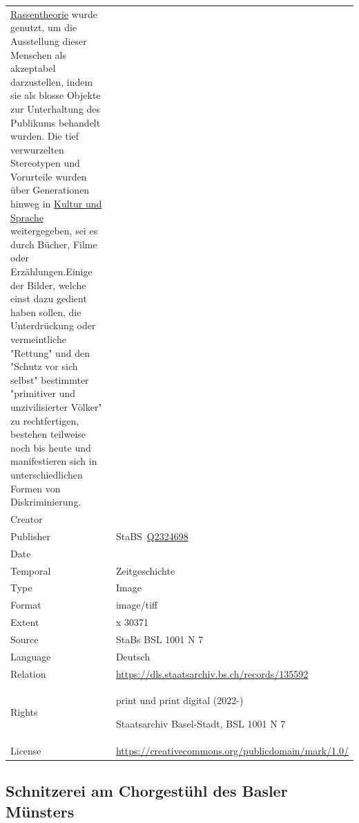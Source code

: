 \documentclass[
  letterpaper,
  DIV=11,
  numbers=noendperiod,
  landscape,
  a4paper,
  geometry:margin=1in]{scrartcl}
\begin{document}
\begin{longtable}[]{@{}
  >{\raggedright\arraybackslash}p{}
  >{\raggedright\arraybackslash}p{}@{}}
\href{https://hls-dhs-dss.ch/de/articles/060537/2024-04-08/}{Rassentheorie}
wurde genutzt, um die Ausstellung dieser Menschen als akzeptabel
darzustellen, indem sie als blosse Objekte zur Unterhaltung des
Publikums behandelt wurden. Die tief verwurzelten Stereotypen und
Vorurteile wurden über Generationen hinweg in
\href{https://mirsindvoda.ch/voelkerschauen-in-der-schweiz/}{Kultur und
Sprache} weitergegeben, sei es durch Bücher, Filme oder
Erzählungen.Einige der Bilder, welche einst dazu gedient haben sollen,
die Unterdrückung oder vermeintliche "Rettung" und den "Schutz vor sich
selbst" bestimmter "primitiver und unzivilisierter Völker" zu
rechtfertigen, bestehen teilweise noch bis heute und manifestieren sich
in unterschiedlichen Formen von Diskriminierung. \textbar{} \\
Creator & \\
Publisher &
StaBS~\href{https://www.wikidata.org/wiki/Q2324698}{Q2324698} \\
Date & 1926 \\
Temporal & Zeitgeschichte \\
Type & Image \\
Format & image/tiff \\
Extent & 23376 x 30371 \\
Source & StaBs BSL 1001 N 7 \\
Language & Deutsch \\
Relation & \url{https://dls.staatsarchiv.bs.ch/records/135592} \\
Rights & print und print digital (2022-)

Staatsarchiv Basel-Stadt, BSL 1001 N 7 \\
License & \url{https://creativecommons.org/publicdomain/mark/1.0/} \\
\end{longtable}

\subsection{Schnitzerei am Chorgestühl des Basler
Münsters}\label{schnitzerei-am-chorgestuxfchl-des-basler-muxfcnsters}
\end{document}
